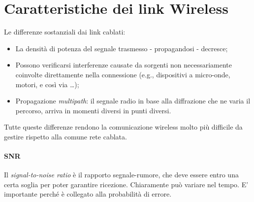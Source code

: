 \section{Caratteristiche dei link Wireless}
Le differenze sostanziali dai link cablati:
\begin{itemize}
	\item La densità di potenza del segnale trasmesso - propagandosi - decresce;
	\item Possono verificarsi interferenze causate da sorgenti non necessariamente coinvolte direttamente nella connessione (e.g., dispositivi a micro-onde, motori, e così via \ldots);
	\item Propagazione \textit{multipath}: il segnale radio in base alla diffrazione che ne varia il percorso, arriva in momenti diversi in punti diversi.
\end{itemize}
Tutte queste differenze rendono la comunicazione wireless molto più difficile da gestire rispetto alla comune rete cablata.

\paragraph{SNR}
Il \textit{signal-to-noise ratio} è il rapporto segnale-rumore, che deve essere entro una certa soglia per poter garantire ricezione. Chiaramente può variare nel tempo. E' importante perché è collegato alla probabilità di errore. \\

